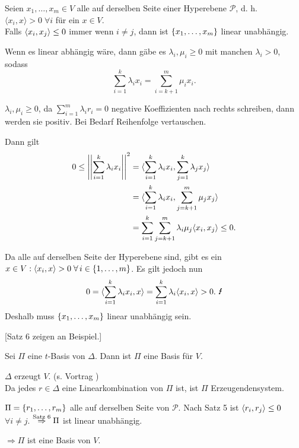 \documentclass[12pt]{extarticle}
\begin{document}
\begin{satz} %
    Seien \( x_1, \ldots, x_m \in V \) alle auf derselben 
    Seite einer Hyperebene \( \mathscr{P} \), 
    d. h. \( \langle x_i, x \rangle > 0 \;\forall i \) für 
    ein \( x\in V \). \\
    Falls \( \langle x_i, x_j \rangle \leq 0 \) immer wenn 
    \( i \neq j \), dann ist \( \{x_1, \ldots, x_m\} \) 
    linear unabhängig.
\end{satz}

\begin{bew}
    Wenn es linear abhängig wäre, dann gäbe es 
    \( \lambda_i, \mu_i \geq 0 \) mit 
    manchen \( \lambda_i > 0 \), sodass 
    \[ \sum_{i=1}^k \lambda_i x_i 
    = \sum_{i=k+1}^m \mu_i x_i. \]
    
    \( \lambda_i, \mu_i \geq 0 \), da 
    \( \sum_{i=1}^m \lambda_i r_i = 0 \) 
    negative Koeffizienten nach rechts schreiben, 
    dann werden sie positiv. Bei Bedarf 
    Reihenfolge vertauschen.

    Dann gilt 
    \begin{align*}
        0 \leq \norm{\sum_{i=1}^k \lambda_i x_i}^2 
        &= \scalarprod{\sum_{i=1}^{k} \lambda_{i} x_{i}}{
        \sum_{j=1}^{k} \lambda_{j} x_{j}} \\
        &= \scalarprod{\sum_{i=1}^{k} \lambda_{i} x_{i}}{
        \sum_{j=k+1}^{m} \mu_{j} x_{j}} \\
        &= \sum_{i=1}^{k} \sum_{j=k+1}^{m} \lambda_{i} \mu_{j}
        \scalarprod{x_i}{x_j} 
        \leq 0. %
    \end{align*}

    Da alle auf derselben Seite der Hyperebene sind, 
    gibt es ein \( x \in V: \scalarprod{x_i}{x} > 0 
    \;\forall i \in \set{1,\ldots, m} \).
    Es gilt jedoch nun 
    \[ 0 = \scalarprod{\sum_{i=1}^{k} \lambda_i x_i}{x} 
    = \sum_{i=1}^k \lambda_i \scalarprod{x_i}{x} > 0. \text{ \Lightning{}} \]
    Deshalb muss \( \{x_1, \ldots, x_m\} \) linear 
    unabhängig sein.
\end{bew}
{\Large{}[Satz 6 zeigen an Beispiel.]}

\begin{satz} %
    Sei \( \Pi \) eine \(t\)-Basis von \( \Delta \). Dann ist 
    \( \Pi \) eine Basis für \( V \).
\end{satz}
\begin{bew}
    \( \Delta \) erzeugt \( V \). (s. Vortrag )\\
    Da jedes \( r \in \Delta \) eine Linearkombination von \( \Pi \) ist, 
    ist \( \Pi \) Erzeugendensystem.

    \( \Pi = \{r_1, \ldots, r_m\} \) alle auf derselben Seite 
    von \( \mathscr{P} \). Nach Satz 5 ist \( \langle r_i, r_j \rangle \leq 0 \)
    \( \forall i \neq j \). \( \overset{\text{Satz 6}}{\Rightarrow} \Pi \) 
    ist linear unabhängig.

    \( \Rightarrow \Pi \) ist eine Basis von \(V\).
\end{bew}
\end{document}
